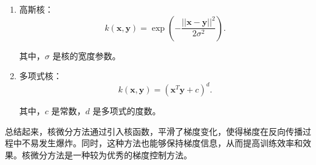 \begin{enumerate}

\item 高斯核：
\begin{equation}
  k(\mathbf{x}, \mathbf{y}) = \exp\left(-\frac{||\mathbf{x} - \mathbf{y}||^2}{2\sigma^2}\right).
\end{equation}

其中，\(\sigma\) 是核的宽度参数。

\item 多项式核：
\begin{equation}
  k(\mathbf{x}, \mathbf{y}) = (\mathbf{x}^T \mathbf{y} + c)^d.
\end{equation}

其中，\(c\) 是常数，\(d\) 是多项式的度数。

\end{enumerate}

总结起来，核微分方法通过引入核函数，平滑了梯度变化，使得梯度在反向传播过程中不易发生爆炸。同时，这种方法也能够保持梯度信息，从而提高训练效率和效果。核微分方法是一种较为优秀的梯度控制方法。